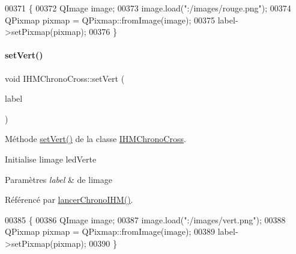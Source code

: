\begin{DoxyCode}
00371 \{
00372     QImage image;
00373     image.load(\textcolor{stringliteral}{":/images/rouge.png"});
00374     QPixmap pixmap = QPixmap::fromImage(image);
00375     label->setPixmap(pixmap);
00376 \}
\end{DoxyCode}
\mbox{\label{class_i_h_m_chrono_cross_aba2b1a136332baa7bd4905f9af15705b}} 
\paragraph{\texorpdfstring{set\+Vert()}{setVert()}}
{\footnotesize\ttfamily void I\+H\+M\+Chrono\+Cross\+::set\+Vert (\begin{DoxyParamCaption}\item[{Q\+Label $\ast$}]{label }\end{DoxyParamCaption})\hspace{0.3cm}{\ttfamily [private]}}



Méthode \hyperlink{class_i_h_m_chrono_cross_aba2b1a136332baa7bd4905f9af15705b}{set\+Vert()} de la classe \hyperlink{class_i_h_m_chrono_cross}{I\+H\+M\+Chrono\+Cross}. 

Initialise l\textquotesingle{}image led\+Verte 
\begin{DoxyParams}{Paramètres}
{\em label} & de l\textquotesingle{}image \\
\hline
\end{DoxyParams}


Référencé par \hyperlink{class_i_h_m_chrono_cross_a0e78f2d4d5e46c4551fc4517614a56d8}{lancer\+Chrono\+I\+H\+M()}.


\begin{DoxyCode}
00385 \{
00386     QImage image;
00387     image.load(\textcolor{stringliteral}{":/images/vert.png"});
00388     QPixmap pixmap = QPixmap::fromImage(image);
00389     label->setPixmap(pixmap);
00390 \}
\end{DoxyCode}
\mbox{\label{class_i_h_m_chrono_cross_aca8b5d6683a3ab0018066ec16968f3f3}} 
